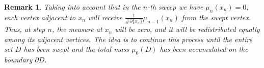 \documentclass{article}
\newtheorem{remark}{Remark}
\begin{document}
\begin{remark}
    
Taking into account that in the $n$-th sweep we have $\mu_n(x_n) = 0$, each vertex adjacent to $x_n$ will receive $\frac{1}{\#\partial \{ x_n \}} \mu_{n-1}(x_n)$ from the swept vertex. Thus, at step $n$, the measure at $x_n$ will be zero, and it will be redistributed equally among its adjacent vertices. The idea is to continue this process until the entire set $D$ has been swept and the total mass $\mu_0(D)$ has been accumulated on the boundary $\partial D$.

\begin{center}
    


\begin{tikzpicture}[x=0.75pt,y=0.75pt,yscale=-1,xscale=1]


\end{tikzpicture}
\end{center}
\end{remark}
\end{document}

